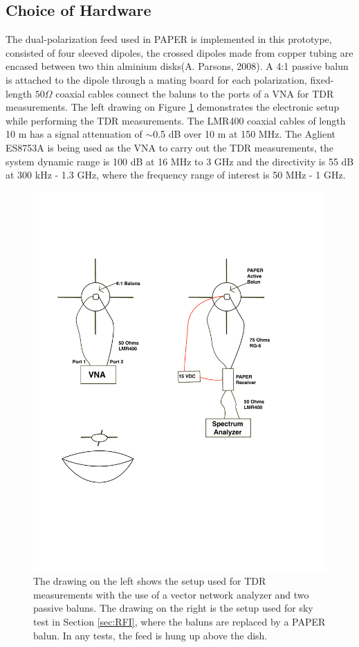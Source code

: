 \documentclass[preprint]{aastex}  %
\begin{document}
\subsection{Choice of Hardware}
The dual-polarization feed used in PAPER is implemented in this prototype, consisted of four
 sleeved dipoles, the crossed dipoles made from copper tubing are encased between two thin
 alminium disks(A. Parsons, 2008). A 4:1 passive balun is attached to the dipole through a
 mating board for each polarization, fixed-length $50\Omega$ coaxial cables connect the
 baluns to the ports of a VNA for TDR measurements. The left drawing on Figure
 \ref{fig:connection} demonstrates the electronic setup while performing the TDR
 measurements. The LMR400 coaxial cables of length 10 m has a signal attenuation of
 $\sim$0.5 dB over 10 m at 150 MHz. The Aglient ES8753A is being used as the VNA to carry
 out the TDR measurements, the system dynamic range is 100 dB at 16 MHz to 3 GHz and the
 directivity is 55 dB at 300 kHz - 1.3 GHz, where the frequency range of interest is 50 MHz - 1
 GHz. 

\begin{figure}[H]
	\begin{center}
	\includegraphics[width =.4\textwidth]{./dish_plots/dishdrawsetup}
	\caption{The drawing on the left shows the setup used for TDR measurements with the use of a vector network analyzer and two passive baluns. The drawing on the right is the setup used for sky test in Section \ref{sec:RFI}, where the baluns are replaced by a PAPER balun. In any tests, the feed is hung up above the dish.
\label{fig:connection}}
	\end{center}
\end{figure}
\clearpage
\end{document}
